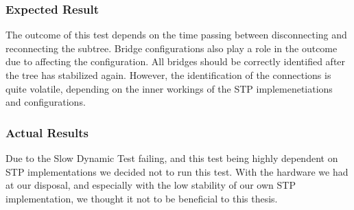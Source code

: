 \subsubsection*{Expected Result}
The outcome of this test depends on the time passing between disconnecting and reconnecting the subtree.
Bridge configurations also play a role in the outcome due to affecting the configuration.
All bridges should be correctly identified after the tree has stabilized again.
However, the identification of the connections is quite volatile, depending on the inner workings of the STP implemenetiations and configurations.

\subsubsection*{Actual Results}
Due to the Slow Dynamic Test failing, and this test being highly dependent on STP implementations we decided not to run this test.
With the hardware we had at our disposal, and especially with the low stability of our own STP implementation, we thought it not to be beneficial to this thesis.
